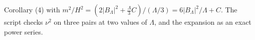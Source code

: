 Corollary (4) with $m^{2}/H^{2} = (2|B_{\Lambda}|^{2} + \tfrac{\Lambda}{3}C)/(\Lambda/3) = 6|B_{\Lambda}|^{2}/\Lambda + C$. The script checks $\nu^{2}$ on three pairs at two values of $\Lambda$, and the expansion as an exact power series.
